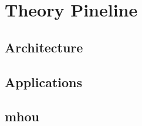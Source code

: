 
\chapter{Theory Pineline}
\label{ch:pine}
\minitoc
\adjustmtc



\section{Architecture}
\label{sec:pine/arch}


\section{Applications}
\label{sec:pine/app}


\section{\acrlong*{mhou}}
\label{sec:pine/mhou}

